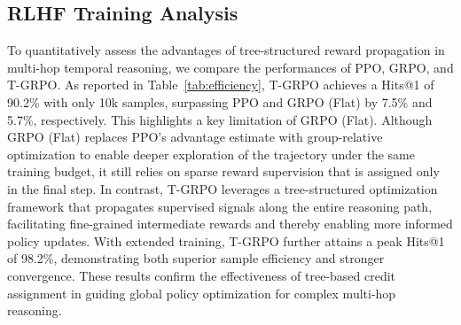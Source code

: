 \documentclass[letterpaper]{article} %
\begin{document}
\subsection{RLHF Training Analysis}
\label{subsec:efficiency}
\begin{table}[h]
\centering
{}
\caption{Training results compared with different RLHF approaches.}
\label{tab:efficiency}
\end{table}
To quantitatively assess the advantages of tree-structured reward propagation in multi-hop temporal reasoning, we compare the performances of PPO, GRPO, and T-GRPO. As reported in Table~\ref{tab:efficiency}, T-GRPO achieves a Hits@1 of 90.2\% with only 10k samples, surpassing PPO and GRPO (Flat) by 7.5\% and 5.7\%, respectively. This highlights a key limitation of GRPO (Flat). Although GRPO (Flat) replaces PPO’s advantage estimate with group-relative optimization to enable deeper exploration of the trajectory under the same training budget, it still relies on sparse reward supervision that is assigned only in the final step. 
In contrast, T-GRPO leverages a tree-structured optimization framework that propagates supervised signals along the entire reasoning path, facilitating fine-grained intermediate rewards and thereby enabling more informed policy updates. With extended training, T-GRPO further attains a peak Hits@1 of 98.2\%, demonstrating both superior sample efficiency and stronger convergence. These results confirm the effectiveness of tree-based credit assignment in guiding global policy optimization for complex multi-hop reasoning.
\end{document}
